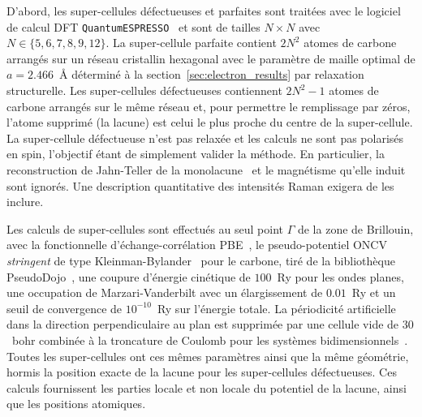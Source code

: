 D'abord, les super-cellules défectueuses et parfaites sont traitées avec le logiciel de calcul DFT \texttt{QuantumESPRESSO}~\cite{giannozziQUANTUMESPRESSOModular2009,giannozziAdvancedCapabilitiesMaterials2017,giannozziQuantumESPRESSOExascale2020} et sont de tailles $N\times N$ avec $N\in\{5, 6, 7, 8, 9, 12\}$. La super-cellule parfaite contient $2N^2$ atomes de carbone arrangés sur un réseau cristallin hexagonal avec le paramètre de maille optimal de $a = 2.466$~\AA{} déterminé à la section~\ref{sec:electron_results} par relaxation structurelle. Les super-cellules défectueuses contiennent $2N^2-1$ atomes de carbone arrangés sur le même réseau et, pour permettre le remplissage par zéros, l'atome supprimé (la lacune) est celui le plus proche du centre de la super-cellule. La super-cellule défectueuse n'est pas relaxée et les calculs ne sont pas polarisés en spin, l'objectif étant de simplement valider la méthode. En particulier, la reconstruction de Jahn-Teller de la monolacune~\cite{el-barbaryStructureEnergeticsVacancy2003} et le magnétisme qu'elle induit~\cite{yazyevDefectinducedMagnetismGraphene2007} sont ignorés. Une description quantitative des intensités Raman exigera de les inclure.

Les calculs de super-cellules sont effectués au seul point $\Gamma$ de la zone de Brillouin, avec la fonctionnelle d'échange-corrélation PBE~\cite{perdewGeneralizedGradientApproximation1996a}, le pseudo-potentiel ONCV \textit{stringent} de type Kleinman-Bylander~\cite{hamannOptimizedNormconservingVanderbilt2013,kleinmanEfficaciousFormModel1982} pour le carbone, tiré de la bibliothèque PseudoDojo~\cite{vansettenPseudoDojoTrainingGrading2018}, une coupure d'énergie cinétique de $100$~Ry pour les ondes planes, une occupation de Marzari-Vanderbilt avec un élargissement de $0.01$~Ry et un seuil de convergence de $10^{-10}$~Ry sur l'énergie totale. La périodicité artificielle dans la direction perpendiculaire au plan est supprimée par une cellule vide de $30$~bohr combinée à la troncature de Coulomb pour les systèmes bidimensionnels~\cite{sohierDensityFunctionalPerturbation2017}. Toutes les super-cellules ont ces mêmes paramètres ainsi que la même géométrie, hormis la position exacte de la lacune pour les super-cellules défectueuses. Ces calculs fournissent les parties locale et non locale du potentiel de la lacune, ainsi que les positions atomiques.

\bigskip
{}

